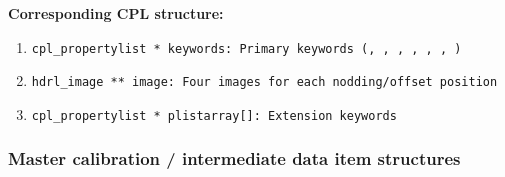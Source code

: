\begin{datastructdef}
\textbf{Corresponding \ac{CPL} structure:}
\begin{enumerate}
    \item \texttt{cpl\_propertylist * keywords: Primary keywords (\hyperref[fits:dpr.catg]{},  \hyperref[fits:dpr.tech]{},  \hyperref[fits:dpr.type]{},  \hyperref[fits:ins.opti3.name]{},  \hyperref[fits:ins.opti9.name]{},  \hyperref[fits:ins.opti10.name]{}, \hyperref[fits:ins.opti11.name]{})}
    \item \texttt{hdrl\_image ** image: Four images for each nodding/offset position}
    \item \texttt{cpl\_propertylist * plistarray[]: Extension keywords}
\end{enumerate}
\end{datastructdef}





\subsubsection{Master calibration / intermediate data item structures}\label{sssec:lmsprocdatastructs}



